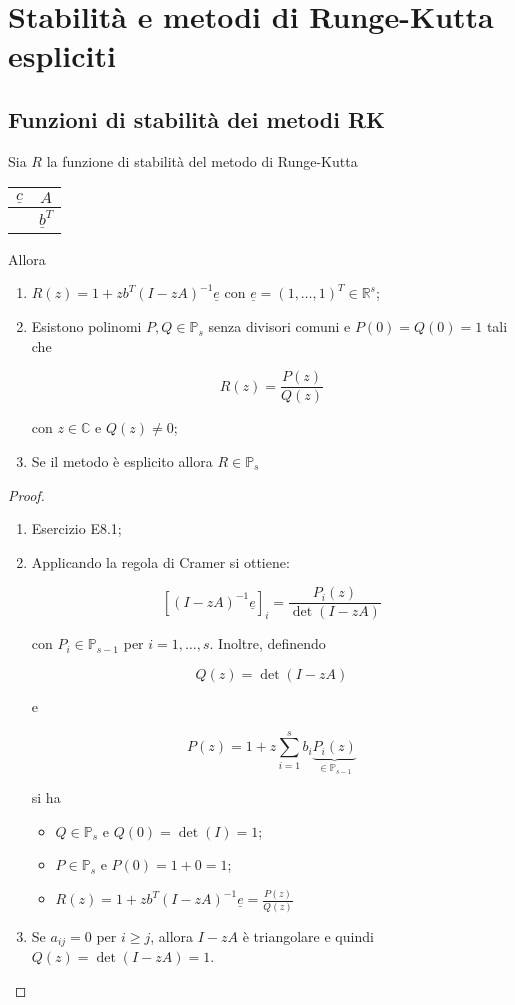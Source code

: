 \documentclass[hidelinks, 10pt]{report}
\begin{document}
\section{Stabilit\`a e metodi di Runge-Kutta espliciti} %
\subsection{Funzioni di stabilit\`a dei metodi RK}	\label{section:22.1}
Sia $ R $ la funzione di stabilit\`a del metodo di Runge-Kutta 

\begin{center}
\begin{tabular}{c|c}
$ \underline{c} $ & $ A $ \\
\hline
				  & $ \underline{b}^{T} $ \\
\end{tabular}
\end{center}

Allora 

\begin{enumerate}
\item $ R(z) = 1 + z b^{T} (I - zA)^{-1} \underline{e} $ con $ \underline{e} = (1 , \dotsc, 1)^{T} \in \mathbb{R}^{s} $;
\item Esistono polinomi $ P, Q \in \mathbb{P}_{s} $ senza divisori comuni e $ P(0) = Q(0) = 1 $ tali che

\[ R(z) = \frac{P(z)}{Q(z)} \]

con $ z \in \mathbb{C} $ e $ Q(z) \ne 0 $;
\item Se il metodo \`e esplicito allora $ R \in \mathbb{P}_{s} $
\end{enumerate}

\begin{proof}
\noindent
\begin{enumerate}
\item Esercizio E8.1;	%
\item Applicando la regola di Cramer si ottiene:

\[ [(I - zA)^{-1} \underline{e} ]_{i} = \frac{P_{i} (z)}{\det (I - zA)} \]

con $ P_{i} \in \mathbb{P}_{s - 1} $ per $ i = 1, \dotsc, s $. Inoltre, definendo

\[ Q(z) = \det (I - zA) \]

e

\[ P(z) = 1 + z \sum\limits_{i = 1}^{s} b_{i} \underbrace{P_{i}(z)}_{\in \mathbb{P}_{s - 1}} \]

si ha

\begin{itemize}
\item $ Q \in \mathbb{P}_{s} $ e $ Q(0) = \det (I) = 1 $;
\item $ P \in \mathbb{P}_{s} $ e $ P(0) = 1 + 0 = 1 $;
\item $ R(z) = 1 + zb^{T} (I - zA)^{-1} \underline{e} = \frac{P(z)}{Q(z)} $
\end{itemize}

\item Se $ a_{ij} = 0 $ per $ i \ge j $, allora $ I - zA $ \`e triangolare e quindi $ Q(z) = \det (I - zA) = 1 $.
\end{enumerate}
\end{proof}
\end{document}
